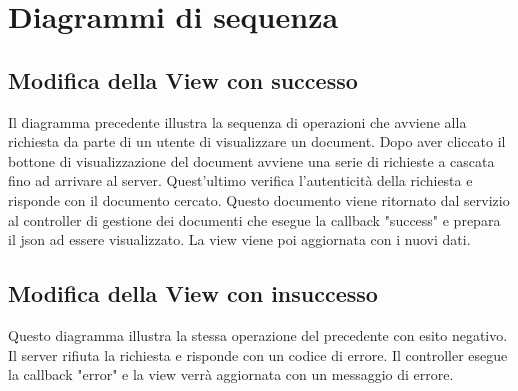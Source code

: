 \newpage


\section{Diagrammi di sequenza}
\label{sequenza}
\subsection{Modifica della View con successo}
Il diagramma precedente illustra la sequenza di operazioni che avviene alla richiesta da parte di un utente di visualizzare un document.
Dopo aver cliccato il bottone di visualizzazione del document avviene una serie di richieste a cascata fino ad arrivare al server. Quest'ultimo verifica l'autenticità della richiesta e risponde con il documento cercato.
Questo documento viene ritornato dal servizio al controller di gestione dei documenti che esegue la callback "success" e prepara il json ad essere visualizzato.
La view viene poi aggiornata con i nuovi dati.

\subsection{Modifica della View con insuccesso}
Questo diagramma illustra la stessa operazione del precedente con esito negativo. Il server rifiuta la richiesta e risponde con un codice di errore.
Il controller esegue la callback "error" e la view verrà aggiornata con un messaggio di errore.


